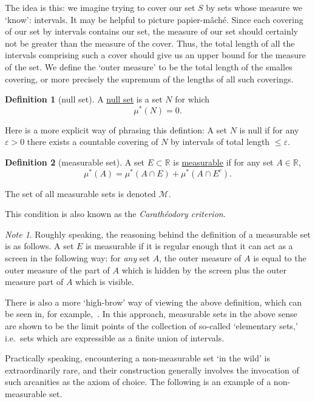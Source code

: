 \documentclass[a4paper]{scrartcl}
\newcommand{\R}{\mathbb{R}}
\newcommand{\defn}[1]{\ul{#1}}
\theoremstyle{definition}
\newtheorem{definition}{Definition}[section]
\theoremstyle{plain}
\theoremstyle{remark}
\newtheorem{note}{Note}[section]
\begin{document}
The idea is this: we imagine trying to cover our set $S$ by sets whose measure we `know': intervals. It may be helpful to picture papier-m\^{a}ch\'{e}. Since each covering of our set by intervals contains our set, the measure of our set should certainly not be greater than the measure of the cover. Thus, the total length of all the intervals comprising such a cover should give us an upper bound for the measure of the set. We define the `outer measure' to be the total length of the smalles covering, or more precisely the supremum of the lengths of all such coverings.

\begin{definition}[null set]
  \label{def:nullset}
  A \defn{null set} is a set $N$ for which
  \begin{equation*}
    \mu^{*}(N) = 0.
  \end{equation*}

  Here is a more explicit way of phrasing this defintion: A set $N$ is null if for any $\varepsilon > 0$ there exists a countable covering of $N$ by intervals of total length $\leq \varepsilon$.
\end{definition}

\begin{definition}[measurable set]
  \label{def:measurableset}
  A set $E \subset \R$ is \defn{measurable} if for any set $A \in \R$,
  \begin{equation*}
    \mu^{*}(A) = \mu^{*}(A \cap E) + \mu^{*} (A \cap E^{c}).
  \end{equation*}

  The set of all measurable sets is denoted $\mathcal{M}$.

  This condition is also known as the \emph{Carath\'{e}odory criterion}.
\end{definition}

\begin{note}
  Roughly speaking, the reasoning behind the definition of a measurable set is as follows. A set $E$ is measurable if it is regular enough that it can act as a screen in the following way: for \emph{any} set $A$, the outer measure of $A$ is equal to the outer measure of the part of $A$ which is hidden by the screen plus the outer measure part of $A$ which is visible.

  There is also a more `high-brow' way of viewing the above definition, which can be seen in, for example,~\cite{measurablesetsarelimitpoints}. In this approach, measurable sets in the above sense are shown to be the limit points of the collection of so-called `elementary sets,' i.e.\ sets which are expressible as a finite union of intervals.

  Practically speaking, encountering a non-measurable set `in the wild' is extraordinarily rare, and their construction generally involves the invocation of such arcanities as the axiom of choice. The following is an example of a non-measurable set.
\end{note}
\end{document}
